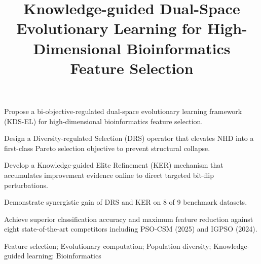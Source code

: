 



\title{Knowledge-guided Dual-Space Evolutionary Learning for
High-Dimensional Bioinformatics Feature Selection}




\begin{highlights}
\item Propose a bi-objective-regulated dual-space evolutionary learning
      framework (KDS-EL) for high-dimensional bioinformatics feature selection.
\item Design a Diversity-regulated Selection (DRS) operator that elevates
      NHD into a first-class Pareto selection objective to prevent structural collapse.
\item Develop a Knowledge-guided Elite Refinement (KER) mechanism that
      accumulates improvement evidence online to direct targeted bit-flip perturbations.
\item Demonstrate synergistic gain of DRS and KER on 8 of 9 benchmark datasets.
\item Achieve superior classification accuracy and maximum feature reduction
      against eight state-of-the-art competitors including PSO-CSM (2025) and IGPSO (2024).
\end{highlights}



Feature selection; Evolutionary computation; Population diversity;
Knowledge-guided learning; Bioinformatics


